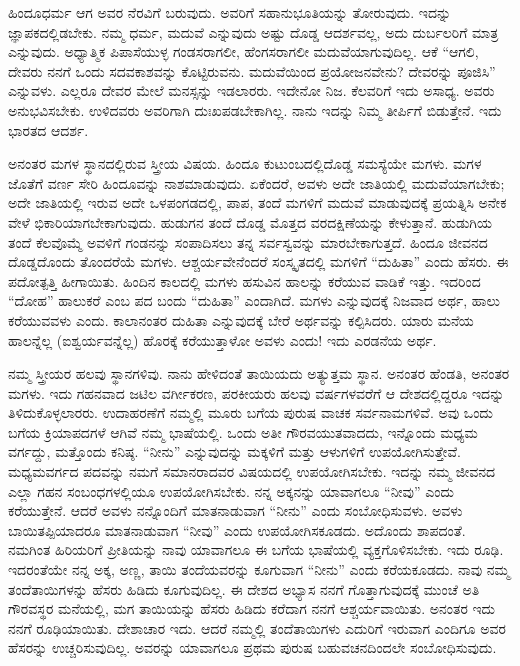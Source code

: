 ಹಿಂದೂಧರ್ಮ ಆಗ ಅವರ ನೆರವಿಗೆ ಬರುವುದು. ಅವರಿಗೆ ಸಹಾನುಭೂತಿಯನ್ನು ತೋರುವುದು. ಇದನ್ನು ಜ್ಞಾಪಕದಲ್ಲಿಡಬೇಕು. ನಮ್ಮ ಧರ್ಮ, ಮದುವೆ ಎನ್ನುವುದು ಅಷ್ಟು ದೊಡ್ಡ ಆದರ್ಶವಲ್ಲ, ಅದು ದುರ್ಬಲರಿಗೆ ಮಾತ್ರ ಎನ್ನುವುದು. ಅಧ್ಯಾತ್ಮಿಕ ಪಿಪಾಸೆಯುಳ್ಳ ಗಂಡಸರಾಗಲೀ, ಹೆಂಗಸರಾಗಲೀ ಮದುವೆಯಾಗುವುದಿಲ್ಲ. ಆಕೆ “ಆಗಲಿ, ದೇವರು ನನಗೆ ಒಂದು ಸದವಕಾಶವನ್ನು ಕೊಟ್ಟಿರುವನು. ಮದುವೆಯಿಂದ ಪ್ರಯೋಜನವೇನು? ದೇವರನ್ನು ಪೂಜಿಸಿ” ಎನ್ನುವಳು. ಎಲ್ಲರೂ ದೇವರ ಮೇಲೆ ಮನಸ್ಸನ್ನು ಇಡಲಾರರು. ಇದೇನೋ ನಿಜ. ಕೆಲವರಿಗೆ ಇದು ಅಸಾಧ್ಯ. ಅವರು ಅನುಭವಿಸಬೇಕು. ಉಳಿದವರು ಅವರಿಗಾಗಿ ದುಃಖಪಡಬೇಕಾಗಿಲ್ಲ. ನಾನು ಇದನ್ನು ನಿಮ್ಮ ತೀರ್ಪಿಗೆ ಬಿಡುತ್ತೇನೆ. ಇದು ಭಾರತದ ಆದರ್ಶ.

ಅನಂತರ ಮಗಳ ಸ್ಥಾನದಲ್ಲಿರುವ ಸ್ತ್ರೀಯ ವಿಷಯ. ಹಿಂದೂ ಕುಟುಂಬದಲ್ಲಿ\break ದೊಡ್ಡ ಸಮಸ್ಯೆಯೇ ಮಗಳು. ಮಗಳ ಜೊತೆಗೆ ವರ್ಣ ಸೇರಿ ಹಿಂದೂವನ್ನು ನಾಶಮಾಡುವುದು. ಏಕೆಂದರೆ, ಅವಳು ಅದೇ ಜಾತಿಯಲ್ಲಿ ಮದುವೆಯಾಗಬೇಕು; ಅದೇ ಜಾತಿಯಲ್ಲಿ ಇರುವ ಅದೇ ಒಳಪಂಗಡದಲ್ಲಿ, ಪಾಪ, ತಂದೆ ಮಗಳಿಗೆ ಮದುವೆ ಮಾಡುವುದಕ್ಕೆ ಪ್ರಯತ್ನಿಸಿ ಅನೇಕ ವೇಳೆ ಭಿಕಾರಿಯಾಗಬೇಕಾಗುವುದು. ಹುಡುಗನ ತಂದೆ ದೊಡ್ಡ ಮೊತ್ತದ ವರದಕ್ಷಿಣೆಯನ್ನು ಕೇಳುತ್ತಾನೆ. ಹುಡುಗಿಯ ತಂದೆ ಕೆಲವೊಮ್ಮೆ ಅವಳಿಗೆ ಗಂಡನನ್ನು ಸಂಪಾದಿಸಲು ತನ್ನ ಸರ್ವಸ್ವವನ್ನು ಮಾರಬೇಕಾಗುತ್ತದೆ. ಹಿಂದೂ ಜೀವನದ ದೊಡ್ಡದೊಂದು ತೊಂದರೆಯೆ ಮಗಳು. ಆಶ್ಚರ್ಯವೇನೆಂದರೆ ಸಂಸ್ಕೃತದಲ್ಲಿ ಮಗಳಿಗೆ “ದುಹಿತಾ” ಎಂದು ಹೆಸರು. ಈ ಪದೋತ್ಪತ್ತಿ ಹೀಗಾಯಿತು. ಹಿಂದಿನ ಕಾಲದಲ್ಲಿ ಮಗಳು ಹಸುವಿನ ಹಾಲನ್ನು ಕರೆಯುವ ವಾಡಿಕೆ ಇತ್ತು. ಇದರಿಂದ “ದೋಹ” ಹಾಲುಕರೆ ಎಂಬ ಪದ ಬಂದು “ದುಹಿತಾ” ಎಂದಾಗಿದೆ. ಮಗಳು ಎನ್ನುವುದಕ್ಕೆ ನಿಜವಾದ ಅರ್ಥ, ಹಾಲು ಕರೆಯುವವಳು ಎಂದು. ಕಾಲಾನಂತರ ದುಹಿತಾ ಎನ್ನುವುದಕ್ಕೆ ಬೇರೆ ಅರ್ಥವನ್ನು ಕಲ್ಪಿಸಿದರು. ಯಾರು ಮನೆಯ ಹಾಲನ್ನೆಲ್ಲ (ಐಶ್ವರ್ಯವನ್ನೆಲ್ಲ) ಹೊರಕ್ಕೆ ಕರೆಯುತ್ತಾಳೋ ಅವಳು ಎಂದು! ಇದು ಎರಡನೆಯ ಅರ್ಥ.

ನಮ್ಮ ಸ್ತ್ರೀಯರ ಹಲವು ಸ್ಥಾನಗಳಿವು. ನಾನು ಹೇಳಿದಂತೆ ತಾಯಿಯದು ಅತ್ಯುತ್ತಮ ಸ್ಥಾನ. ಅನಂತರ ಹೆಂಡತಿ, ಅನಂತರ ಮಗಳು. ಇದು ಗಹನವಾದ ಜಟಿಲ ವರ್ಗೀಕರಣ, ಪರಕೀಯರು ಹಲವು ವರ್ಷಗಳವರೆಗೆ ಆ ದೇಶದಲ್ಲಿದ್ದರೂ ಇದನ್ನು ತಿಳಿದುಕೊಳ್ಳಲಾರರು. ಉದಾಹರಣೆಗೆ ನಮ್ಮಲ್ಲಿ ಮೂರು ಬಗೆಯ ಪುರುಷ ವಾಚಕ ಸರ್ವನಾಮಗಳಿವೆ. ಅವು ಒಂದು ಬಗೆಯ ಕ್ರಿಯಾಪದಗಳೆ ಆಗಿವೆ ನಮ್ಮ ಭಾಷೆಯಲ್ಲಿ. ಒಂದು ಅತೀ ಗೌರವಯುತವಾದದು, ಇನ್ನೊಂದು ಮಧ್ಯಮ ವರ್ಗದ್ದು, ಮತ್ತೊಂದು ಕನಿಷ್ಠ. “ನೀನು” ಎನ್ನುವುದನ್ನು ಮಕ್ಕಳಿಗೆ ಮತ್ತು ಆಳುಗಳಿಗೆ ಉಪಯೋಗಿಸುತ್ತೇವೆ. ಮಧ್ಯಮವರ್ಗದ ಪದವನ್ನು ನಮಗೆ ಸಮಾನರಾದವರ ವಿಷಯದಲ್ಲಿ ಉಪಯೋಗಿಸಬೇಕು. ಇದನ್ನು ನಮ್ಮ ಜೀವನದ ಎಲ್ಲಾ ಗಹನ ಸಂಬಂಧಗಳಲ್ಲಿಯೂ ಉಪಯೋಗಿಸಬೇಕು. ನನ್ನ ಅಕ್ಕನನ್ನು ಯಾವಾಗಲೂ “ನೀವು” ಎಂದು ಕರೆಯುತ್ತೇನೆ. ಆದರೆ ಅವಳು ನನ್ನೊಂದಿಗೆ ಮಾತನಾಡುವಾಗ “ನೀನು” ಎಂದು ಸಂಬೋಧಿಸುವಳು. ಅವಳು ಬಾಯಿತಪ್ಪಿಯಾದರೂ ಮಾತನಾಡುವಾಗ “ನೀವು” ಎಂದು ಉಪಯೋಗಿಸಕೂಡದು. ಅದೊಂದು ಶಾಪದಂತೆ. ನಮಗಿಂತ ಹಿರಿಯರಿಗೆ ಪ್ರೀತಿಯನ್ನು ನಾವು ಯಾವಾಗಲೂ ಈ ಬಗೆಯ ಭಾಷೆಯಲ್ಲಿ ವ್ಯಕ್ತಗೊಳಿಸಬೇಕು. ಇದು ರೂಢಿ. ಇದರಂತೆಯೇ ನನ್ನ ಅಕ್ಕ, ಅಣ್ಣ, ತಾಯಿ ತಂದೆಯವರನ್ನು ಕೂಗುವಾಗ “ನೀನು” ಎಂದು ಕರೆಯಕೂಡದು. ನಾವು ನಮ್ಮ ತಂದೆತಾಯಿಗಳನ್ನು ಹೆಸರು ಹಿಡಿದು ಕೂಗುವುದಿಲ್ಲ. ಈ ದೇಶದ ಅಭ್ಯಾಸ ನನಗೆ ಗೊತ್ತಾಗುವುದಕ್ಕೆ ಮುಂಚೆ ಅತಿ ಗೌರವಸ್ಥರ ಮನೆಯಲ್ಲಿ, ಮಗ ತಾಯಿಯನ್ನು ಹೆಸರು ಹಿಡಿದು ಕರೆದಾಗ ನನಗೆ ಆಶ್ಚರ್ಯವಾಯಿತು. ಅನಂತರ ಇದು ನನಗೆ ರೂಢಿಯಾಯಿತು. ದೇಶಾಚಾರ ಇದು. ಆದರೆ ನಮ್ಮಲ್ಲಿ ತಂದೆತಾಯಿಗಳು ಎದುರಿಗೆ ಇರುವಾಗ ಎಂದಿಗೂ ಅವರ ಹೆಸರನ್ನು ಉಚ್ಚರಿಸುವುದಿಲ್ಲ. ಅವರನ್ನು ಯಾವಾಗಲೂ ಪ್ರಥಮ ಪುರುಷ ಬಹುವಚನದಿಂದಲೇ ಸಂಬೋಧಿಸುವುದು.

